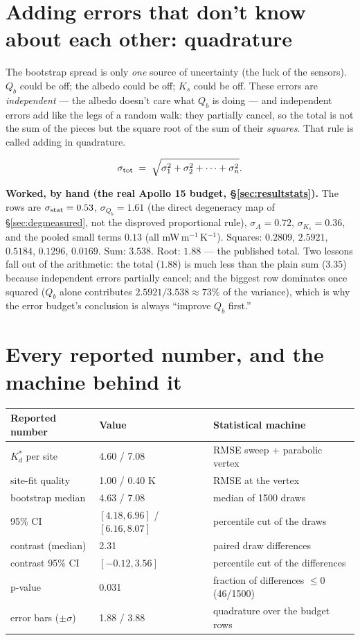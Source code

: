\documentclass[11pt]{report}
\begin{document}
\section{Adding errors that don't know about each other:
quadrature}\label{sec:quadzero}

\begin{plain}
The bootstrap spread is only \emph{one} source of uncertainty (the luck of the
sensors). $Q_b$ could be off; the albedo could be off; $K_s$ could be off.
These errors are \emph{independent} --- the albedo doesn't care what $Q_b$ is
doing --- and independent errors add like the legs of a random walk: they
partially cancel, so the total is not the sum of the pieces but the square
root of the sum of their \emph{squares}. That rule is called adding in
quadrature.
\end{plain}

\[
\sigma_{\rm tot} \;=\; \sqrt{\sigma_1^2 + \sigma_2^2 + \cdots + \sigma_n^2}.
\]

\noindent\textbf{Worked, by hand (the real Apollo 15 budget,
\S\ref{sec:resultstats}).} The rows are $\sigma_{\rm stat}=0.53$,
$\sigma_{Q_b}=1.61$ (the direct degeneracy map of \S\ref{sec:degmeasured},
not the disproved proportional rule), $\sigma_{A}=0.72$,
$\sigma_{K_s}=0.36$, and the pooled
small terms $0.13$ (all mW\,m$^{-1}$\,K$^{-1}$). Squares: $0.2809$, $2.5921$,
$0.5184$, $0.1296$, $0.0169$. Sum: $3.538$. Root: $\boxed{1.88}$ --- the
published total. Two lessons fall out of the arithmetic: the total ($1.88$) is
much less than the plain sum ($3.35$) because independent errors partially
cancel; and the biggest row dominates once squared ($Q_b$ alone contributes
$2.5921/3.538 \approx 73\%$ of the variance), which is why the error budget's
conclusion is always ``improve $Q_b$ first.''

\section{Every reported number, and the machine behind it}

\begin{center}\small
\begin{tabular}{@{}lll@{}}
\toprule
Reported number & Value & Statistical machine \\
\midrule
$K_d^{*}$ per site & 4.60 / 7.08 & RMSE sweep + parabolic vertex \\
site-fit quality & 1.00 / 0.40 K & RMSE at the vertex \\
bootstrap median & 4.63 / 7.08 & median of 1500 draws \\
95\% CI & $[4.18,6.96]$ / $[6.16,8.07]$ & percentile cut of the draws \\
contrast (median) & 2.31 & paired draw differences \\
contrast 95\% CI & $[-0.12, 3.56]$ & percentile cut of the differences \\
p-value & 0.031 & fraction of differences $\leq 0$ (46/1500) \\
error bars ($\pm\sigma$) & 1.88 / 3.88 & quadrature over the budget rows \\
\bottomrule
\end{tabular}
\end{center}
\end{document}
